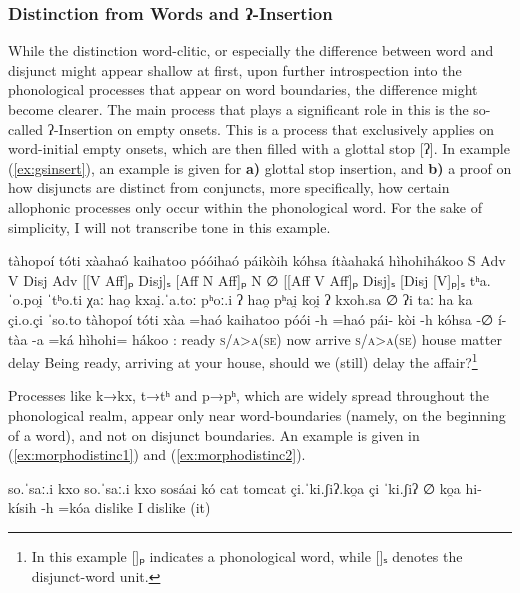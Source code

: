 \documentclass[a4paper, 12pt, oneside]{memoir}
\begin{document}
\subsubsection{Distinction from Words and ʔ-Insertion}\label{smorphonodistinc}
While the distinction word-clitic, or especially the difference between word and disjunct might appear shallow at first, upon further introspection into the phonological processes that appear on word boundaries, the difference might become clearer.
The main process that plays a significant role in this is the so-called ʔ-Insertion on empty onsets. This is a process that exclusively applies on word-initial empty onsets, which are then filled with a glottal stop [ʔ]. In example (\ref{ex:gsinsert}), an example is given for \textbf{a)} glottal stop insertion, and \textbf{b)} a proof on how disjuncts are distinct from conjuncts, more specifically, how certain allophonic processes only occur within the phonological word. For the sake of simplicity, I will not transcribe tone in this example.
\begin{examples}
\newbaarucmd[ans]{=}{\baarujuncture{\texttt{=}}}
    \ex \label{ex:gsinsert}
    \words tàhopoí tóti xàahaó kaihatoo póóihaó páikòih kóhsa ítàahaká hìhohihákoo
    \ans S Adv V Disj Adv [[V Aff]ₚ Disj]ₛ [Aff N Aff]ₚ N ∅ [[Aff V Aff]ₚ Disj]ₛ [Disj [V]ₚ]ₛ 
    \ipa tʰa.ˈo.poi̯ ˈtʰo.ti χaː hao̯ kxai̯.ˈa.toː pʰoː.i ʔ hao̯ pʰai̯ koi̯ ʔ kxoh.sa {∅} ʔi taː ha ka çi.o.çi ˈso.to
    \bits tàhopoí tóti xàa =haó kaihatoo póói -h =haó pái- kòi -h kóhsa -∅ í- tàa -a =ká hìhohi= hákoo
    \gloss {\Fas}:{\Agent} ready {\Cop} \textsc{s/a>a(se)} now arrive {\Ff} \textsc{s/a>a(se)} {\Sshposs} house {\Dat} matter {\Abs} {\Intrg} {\Aux} {\Ff} {\Decl} delay {\Obligative}
    \tr Being ready, arriving at your house, should we (still) delay the affair?\footnote{In this example []ₚ indicates a phonological word, while []ₛ denotes the disjunct-word unit.}
\end{examples}
Processes like k→kx, t→tʰ and p→pʰ, which are widely spread throughout the phonological realm, appear only near word-boundaries (namely, on the beginning of a word), and not on disjunct boundaries. An example is given in (\ref{ex:morphodistinc1}) and (\ref{ex:morphodistinc2}).
\begin{examples}
    \ex \label{ex:morphodistinc1}
    \script so.ˈsaː.i kxo
    \ipa so.ˈsaː.i kxo
    \bits sosáai kó
    \gloss cat {\Tsm}
    \tr tomcat
    \ex \label{ex:morphodistinc2}
    \script çi.ˈki.ʃiʔ.ko̯a
    \ipa çi ˈki.ʃiʔ ∅ ko̯a
    \bits hi- kísih -h =kóa
    \gloss {\Antip} dislike {\Ff} {\Decl} 
    \tr I dislike (it)
\end{examples}
\end{document}
